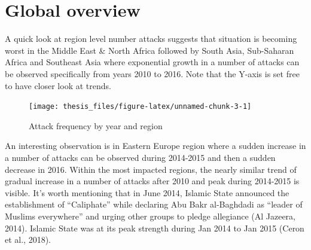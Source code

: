 \documentclass[11pt,oneside,a4paper]{reedthesis}
\newenvironment{Shaded}{\begin{snugshade}}{\end{snugshade}}
\newcommand{\KeywordTok}[1]{\textcolor[rgb]{0.13,0.29,0.53}{\textbf{#1}}}
\newcommand{\DataTypeTok}[1]{\textcolor[rgb]{0.13,0.29,0.53}{#1}}
\newcommand{\StringTok}[1]{\textcolor[rgb]{0.31,0.60,0.02}{#1}}
\newcommand{\OperatorTok}[1]{\textcolor[rgb]{0.81,0.36,0.00}{\textbf{#1}}}
\newcommand{\NormalTok}[1]{#1}
\begin{document}
\section{Global overview}\label{global-overview}
\begin{Shaded}
\end{Shaded}
A quick look at region level number attacks suggests that situation is
becoming worst in the Middle East \& North Africa followed by South
Asia, Sub-Saharan Africa and Southeast Asia where exponential growth in
a number of attacks can be observed specifically from years 2010 to
2016. Note that the Y-axis is set free to have closer look at trends.
\begin{figure}
\texttt{[image: thesis\_files/figure-latex/unnamed-chunk-3-1]} \caption{Attack frequency by year and region}\label{fig:unnamed-chunk-3}
\end{figure}
An interesting observation is in Eastern Europe region where a sudden
increase in a number of attacks can be observed during 2014-2015 and
then a sudden decrease in 2016. Within the most impacted regions, the
nearly similar trend of gradual increase in a number of attacks after
2010 and peak during 2014-2015 is visible. It's worth mentioning that in
June 2014, Islamic State announced the establishment of ``Caliphate''
while declaring Abu Bakr al-Baghdadi as ``leader of Muslims everywhere''
and urging other groups to pledge allegiance (Al Jazeera, 2014). Islamic
State was at its peak strength during Jan 2014 to Jan 2015 (Ceron et
al., 2018).
\end{document}
